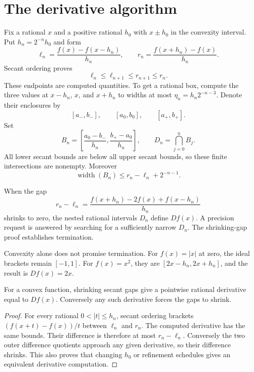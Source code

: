 \section{The derivative algorithm}
Fix a rational $x$ and a positive rational $h_0$ with $x\pm h_0$ in the
convexity interval.  Put $h_n=2^{-n}h_0$ and form
\[
 \ell_n=\frac{f(x)-f(x-h_n)}{h_n},\qquad
 r_n=\frac{f(x+h_n)-f(x)}{h_n}.
\]
Secant ordering proves
\[
 \ell_n\le\ell_{n+1}\le r_{n+1}\le r_n.
\]
These endpoints are computed quantities.  To get a rational box, compute
the three values at $x-h_n$, $x$, and $x+h_n$ to widths at most
$\eta_n=h_n2^{-n-3}$.  Denote their enclosures by
\[
 [a_-,b_-],\qquad [a_0,b_0],\qquad [a_+,b_+].
\]
Set
\[
 B_n=\left[\frac{a_0-b_-}{h_n},\frac{b_+-a_0}{h_n}\right],
 \qquad D_n=\bigcap_{j=0}^nB_j.
\]
All lower secant bounds are below all upper secant bounds, so these finite
intersections are nonempty.  Moreover
\[
 \operatorname{width}(B_n)
 \le r_n-\ell_n+2^{-n-1}.
\]

\begin{definition}\label{def:computed-derivative}
When the gap
\[
 r_n-\ell_n=\frac{f(x+h_n)-2f(x)+f(x-h_n)}{h_n}
\]
shrinks to zero, the nested rational intervals $D_n$ define $Df(x)$.
A precision request is answered by searching for a sufficiently narrow
$D_n$.  The shrinking-gap proof establishes termination.
\end{definition}

Convexity alone does not promise termination.  For $f(x)=|x|$ at zero,
the ideal brackets remain $[-1,1]$.  For $f(x)=x^2$, they are
$[2x-h_n,2x+h_n]$, and the result is $Df(x)=2x$.

\begin{proposition}
For a convex function, shrinking secant gaps give a pointwise rational
derivative equal to $Df(x)$.  Conversely any such derivative forces the
gaps to shrink.
\end{proposition}
\begin{proof}
For every rational $0<|t|\le h_n$, secant ordering brackets
$(f(x+t)-f(x))/t$ between $\ell_n$ and $r_n$.  The computed derivative
has the same bounds.  Their difference is therefore at most $r_n-\ell_n$.
Conversely the two outer difference quotients approach any given derivative,
so their difference shrinks.  This also proves that changing $h_0$ or
refinement schedules gives an equivalent derivative computation.
\end{proof}

